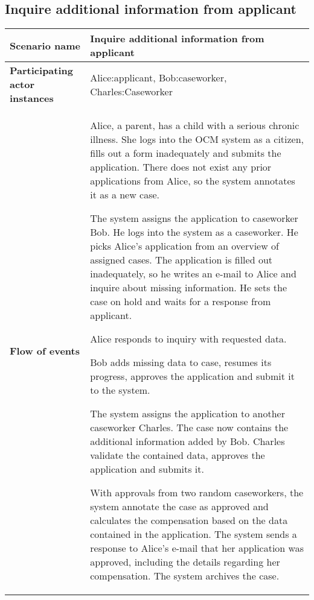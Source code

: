 \subsection*{Inquire additional information from applicant}
\begin{table}[htb!]
\begin{tabularx}{\textwidth}{l|X}
	\textbf{Scenario name} & Inquire additional information from applicant \\
	\hline
	\textbf{Participating actor instances} & Alice:applicant, Bob:caseworker, Charles:Caseworker\\
	\hline
	\textbf{Flow of events} &
	\begin{compactenum}
	        \item Alice, a parent, has a child with a serious chronic illness. She logs into the OCM system as a citizen, fills out a form inadequately and submits the application. There does not exist any prior applications from Alice, so the system annotates it as a new case.
	        \item The system assigns the application to caseworker Bob. He logs into the system as a caseworker. He picks Alice's application from an overview of assigned cases. The application is filled out inadequately, so he writes an e-mail to Alice and inquire about missing information. He sets the case on hold and waits for a response from applicant.
	        \item Alice responds to inquiry with requested data. 
	        \item Bob adds missing data to case, resumes its progress, approves the application and submit it to the system.
	        \item The system assigns the application to another caseworker Charles. The case now contains the additional information added by Bob. Charles validate the contained data, approves the application and submits it.
	        \item With approvals from two random caseworkers, the system annotate the case as approved and calculates the compensation based on the data contained in the application. The system sends a response to Alice's e-mail that her application was approved, including the details regarding her compensation. The system archives the case.
	\end{compactenum}\\
	\hline
\end{tabularx}
\end{table}

\newpage
